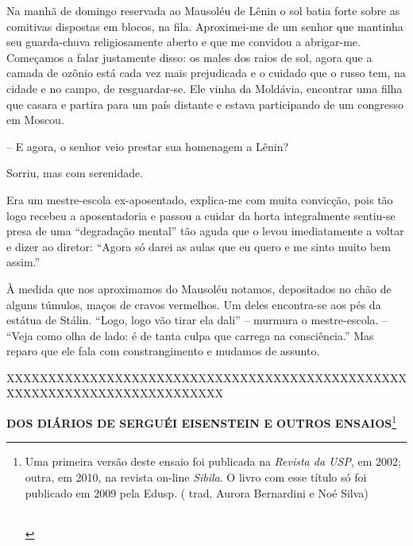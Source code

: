 Na manhã de domingo reservada ao Mausoléu de Lênin o sol batia forte
sobre as comitivas dispostas em blocos, na fila. Aproximei-me de um
senhor que mantinha seu guarda-chuva religiosamente aberto e que me
convidou a abrigar-me. Começamos a falar justamente disso: os males dos
raios de sol, agora que a camada de ozônio está cada vez mais
prejudicada e o cuidado que o russo tem, na cidade e no campo, de
resguardar-se. Ele vinha da Moldávia, encontrar uma filha que casara e
partira para um país distante e estava participando de um congresso em
Moscou.

-- E agora, o senhor veio prestar sua homenagem a Lênin?

Sorriu, mas com serenidade.

Era um mestre-escola ex-aposentado, explica-me com muita convicção, pois
tão logo recebeu a aposentadoria e passou a cuidar da horta
integralmente sentiu-se presa de uma ``degradação mental'' tão aguda que
o levou imediatamente a voltar e dizer ao diretor: ``Agora só darei as
aulas que eu quero e me sinto muito bem assim.''

À medida que nos aproximamos do Mausoléu notamos, depositados no chão de
alguns túmulos, maços de cravos vermelhos. Um deles encontra-se aos pés
da estátua de Stálin. ``Logo, logo vão tirar ela dali'' -- murmura o
mestre-escola. -- ``Veja como olha de lado: é de tanta culpa que carrega
na consciência.'' Mas reparo que ele fala com constrangimento e mudamos
de assunto.

XXXXXXXXXXXXXXXXXXXXXXXXXXXXXXXXXXXXXXXXXXXXXXXXXXXXXXXXXXXXXXXXXXXXXXXXXX

\textbf{DOS DIÁRIOS DE SERGUÉI EISENSTEIN E OUTROS ENSAIOS}\footnote{Uma
  primeira versão deste ensaio foi publicada na \emph{Revista da USP},
  em 2002; outra, em 2010, na revista on-line \emph{Sibila}. O livro com
  esse título só foi publicado em 2009 pela Edusp. ( trad. Aurora
  Bernardini e Noé Silva)

  \begin{longtable}[]{@{}ll@{}}
  \toprule
  &\tabularnewline
  \bottomrule
  \end{longtable}}

